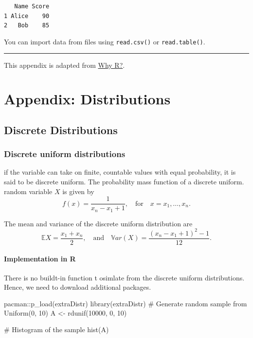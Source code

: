 \documentclass[
  letterpaper,
  DIV=11,
  numbers=noendperiod]{scrreprt}
\newenvironment{Shaded}{\begin{snugshade}}{\end{snugshade}}
\newcommand{\CommentTok}[1]{\textcolor[rgb]{0.37,0.37,0.37}{#1}}
\newcommand{\DecValTok}[1]{\textcolor[rgb]{0.68,0.00,0.00}{#1}}
\newcommand{\FunctionTok}[1]{\textcolor[rgb]{0.28,0.35,0.67}{#1}}
\newcommand{\NormalTok}[1]{\textcolor[rgb]{0.00,0.23,0.31}{#1}}
\newcommand{\OtherTok}[1]{\textcolor[rgb]{0.00,0.23,0.31}{#1}}
\newcommand{\SpecialCharTok}[1]{\textcolor[rgb]{0.37,0.37,0.37}{#1}}
\begin{document}
\begin{verbatim}
   Name Score
1 Alice    90
2   Bob    85
\end{verbatim}

You can import data from files using \texttt{read.csv()} or
\texttt{read.table()}.

\begin{center}\rule{0.5\linewidth}{0.5pt}\end{center}

This appendix is adapted from
\href{https://tqtbui.github.io/introbook/app-rintro.html}{Why R?}.

\chapter{Appendix: Distributions}\label{appendix-distributions}

\newcommand{\E}{\mathbb{E}}
\newcommand{\var}{\mathbb{V}ar}

\section{Discrete Distributions}\label{discrete-distributions}

\subsection{Discrete uniform
distributions}\label{discrete-uniform-distributions}

if the variable can take on finite, countable values with equal
probability, it is said to be discrete uniform. The probability mass
function of a discrete uniform. random variable \(X\) is given by \[
f(x) = \frac{1}{x_n-x_1+1},\quad \text{for}\quad x=x_1,\dots,x_n.
\]

The mean and variance of the discrete uniform distribution are \[
\mathbb EX = \frac{x_1+x_n}{2},\quad \text{and}\quad \mathbb{V}ar(X) = \frac{(x_n-x_1+1)^2 -1}{12}.\]

\subsubsection{Implementation in R}\label{implementation-in-r}

There is no buildt-in function t osimlate from the discrete uniform
distributions. Hence, we need to download additional packages.

\begin{Shaded}
\begin{Highlighting}[]
\NormalTok{pacman}\SpecialCharTok{::}\FunctionTok{p\_load}\NormalTok{(extraDistr)}
\FunctionTok{library}\NormalTok{(extraDistr)}
\CommentTok{\# Generate random sample from Uniform(0, 10)}
\NormalTok{A }\OtherTok{\textless{}{-}} \FunctionTok{rdunif}\NormalTok{(}\DecValTok{10000}\NormalTok{, }\DecValTok{0}\NormalTok{, }\DecValTok{10}\NormalTok{) }

\CommentTok{\# Histogram of the sample}
\FunctionTok{hist}\NormalTok{(A)}
\end{Highlighting}
\end{Shaded}
\end{document}
